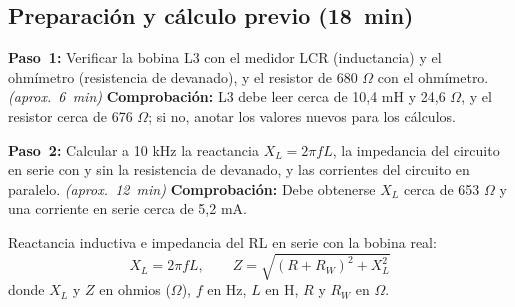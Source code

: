 \documentclass[12pt]{article}
\begin{document}
\subsection{Preparación y cálculo previo (\SI{18}{\minute})}\label{sec:etapa-1}
\begin{pasos}
  \item \textbf{Paso~1:} Verificar la bobina L3 con el medidor LCR (inductancia) y el ohmímetro (resistencia de devanado), y el resistor de 680 \ensuremath{\Omega} con el ohmímetro. \emph{(aprox.~\SI{6}{\minute})} \textbf{Comprobación:} L3 debe leer cerca de 10,4 mH y 24,6 \ensuremath{\Omega}, y el resistor cerca de 676 \ensuremath{\Omega}; si no, anotar los valores nuevos para los cálculos.
  \item \textbf{Paso~2:} Calcular a 10 kHz la reactancia $X_L = 2\pi f L$, la impedancia del circuito en serie con y sin la resistencia de devanado, y las corrientes del circuito en paralelo. \emph{(aprox.~\SI{12}{\minute})} \textbf{Comprobación:} Debe obtenerse $X_L$ cerca de 653 \ensuremath{\Omega} y una corriente en serie cerca de 5,2 mA.
\par Reactancia inductiva e impedancia del RL en serie con la bobina real:
\begin{equation}
  X_L = 2\pi f L, \qquad Z = \sqrt{(R + R_W)^2 + X_L^2}
  \label{eq:paso-2}
\end{equation}
donde $X_L$ y $Z$ en ohmios (\ensuremath{\Omega}), $f$ en Hz, $L$ en H, $R$ y $R_W$ en \ensuremath{\Omega}.
\end{pasos}
\end{document}
